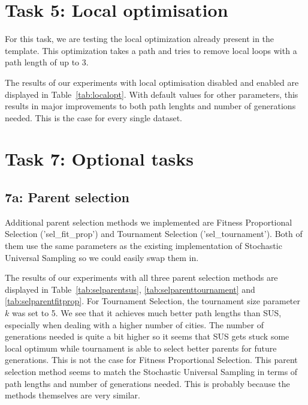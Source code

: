 \documentclass{report}
\begin{document}
\section{Task 5: Local optimisation}
\label{sec:local}
For this task, we are testing the local optimization already present in the template. This optimization takes a path and tries to remove local loops with a path length of up to 3.

The results of our experiments with local optimisation disabled and enabled are displayed in Table~\ref{tab:localopt}. With default values for other parameters, this results in major improvements to both path lenghts and number of generations needed. This is the case for every single dataset.




\section{Task 7: Optional tasks}
\subsection{7a: Parent selection}
Additional parent selection methods we implemented are Fitness Proportional Selection ('sel\_fit\_prop') and Tournament Selection ('sel\_tournament'). Both of them use the same parameters as the existing implementation of Stochastic Universal Sampling so we could easily swap them in.

The results of our experiments with all three parent selection methods are displayed in Table~\ref{tab:selparentsus}, \ref{tab:selparenttournament} and \ref{tab:selparentfitprop}. For Tournament Selection, the tournament size parameter $k$ was set to 5. We see that it achieves much better path lengths than SUS, especially when dealing with a higher number of cities. The number of generations needed is quite a bit higher so it seems that SUS gets stuck some local optimum while tournament is able to select better parents for future generations. This is not the case for Fitness Proportional Selection. This parent selection method seems to match the Stochastic Universal Sampling in terms of path lengths and number of generations needed. This is probably because the methods themselves are very similar.
\end{document}
